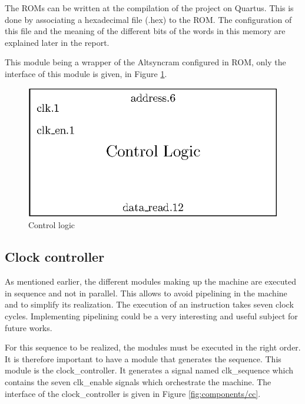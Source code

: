 The ROMs can be written at the compilation of the project on Quartus. This is done by associating a
hexadecimal file (.hex) to the ROM. The configuration of this file and the meaning of the different 
bits of the words in this memory are explained later in the report. 

This module being a wrapper of the Altsyncram configured in ROM, only the interface of this 
module is given, in Figure \ref{fig:components/cl}.

\begin{figure}[H]
    \centering
    \includegraphics[scale=1]{Chapter3-CPU/res/control_logic}
    \caption{Control logic}
    \label{fig:components/cl}
\end{figure}

\subsection{Clock controller}

As mentioned earlier, the different modules making up the machine are executed in sequence and not 
in parallel. This allows to avoid pipelining in the machine and to simplify its realization. The 
execution of an instruction takes seven clock cycles. Implementing pipelining could be a very interesting 
and useful subject for future works. 

For this sequence to be realized, the modules must be executed in the right order. It is therefore 
important to have a module that generates the sequence. This module is the clock\_controller. It
generates a signal named clk\_sequence which contains the seven clk\_enable signals which orchestrate the machine. The interface of the clock\_controller is given in
Figure \ref{fig:components/cc}. 

